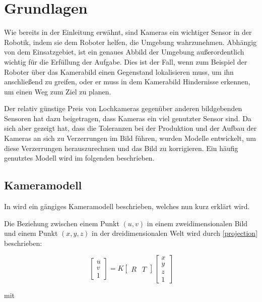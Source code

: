 \chapter{Grundlagen}
\label{chap:grundlagen}

Wie bereits in der Einleitung erwähnt, sind Kameras ein wichtiger Sensor in der Robotik, indem sie dem Roboter helfen, die Umgebung wahrzunehmen. Abhängig von dem Einsatzgebiet, ist ein genaues Abbild der Umgebung außerordentlich wichtig für die Erfüllung der Aufgabe. Dies ist der Fall, wenn zum Beispiel der Roboter über das Kamerabild einen Gegenstand lokalisieren muss, um ihn anschließend zu greifen, oder er muss in dem Kamerabild Hindernisse erkennen, um einen Weg zum Ziel zu planen.

Der relativ günstige Preis von Lochkameras gegenüber anderen bildgebenden Sensoren hat dazu beigetragen, dass Kameras ein viel genutzter Sensor sind. Da sich aber gezeigt hat, dass die Toleranzen bei der Produktion und der Aufbau der Kameras an sich zu Verzerrungen im Bild führen, wurden Modelle entwickelt, um diese Verzerrungen herauszurechnen und das Bild zu korrigieren. Ein häufig genutztes Modell wird im folgenden beschrieben.

\section{Kameramodell} %
\label{sec:kameramodell}
In \cite{Zhang} wird ein gängiges Kameramodell beschrieben, welches nun kurz erklärt wird.

Die Beziehung zwischen einem Punkt $(u, v)$ in einem zweidimensionalen Bild und einem Punkt $(x, y, z)$ in der dreidimensionalen Welt wird durch \autoref{projection} beschrieben:

\begin{equation}
\begin{bmatrix}
 	u \\
 	v \\
 	1
\end{bmatrix} = K 
\begin{bmatrix}
   	R & T
\end{bmatrix} 
\begin{bmatrix}
   	x \\
   	y \\
   	z \\
   	1
\end{bmatrix} \label{projection}
\end{equation}

mit 

